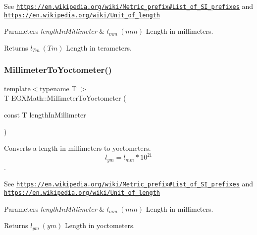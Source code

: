 See \href{https://en.wikipedia.org/wiki/Metric_prefix#List_of_SI_prefixes}{\tt https\+://en.\+wikipedia.\+org/wiki/\+Metric\+\_\+prefix\#\+List\+\_\+of\+\_\+\+S\+I\+\_\+prefixes} and \href{https://en.wikipedia.org/wiki/Unit_of_length}{\tt https\+://en.\+wikipedia.\+org/wiki/\+Unit\+\_\+of\+\_\+length} 
\begin{DoxyParams}{Parameters}
{\em length\+In\+Millimeter} & $ l_{mm}\ (mm)$ Length in millimeters. \\
\hline
\end{DoxyParams}
\begin{DoxyReturn}{Returns}
$ l_{Tm}\ (Tm)$ Length in terameters. 
\end{DoxyReturn}
\mbox{\label{group___e_g_x_math-_conversions-_length_conversions-_s_i-_millimeter-_s_i_ga7f8020bb633d6ed2cd874a8c66d2893d}} 
\subsubsection{\texorpdfstring{Millimeter\+To\+Yoctometer()}{MillimeterToYoctometer()}}
{\footnotesize\ttfamily template$<$typename T $>$ \\
T E\+G\+X\+Math\+::\+Millimeter\+To\+Yoctometer (\begin{DoxyParamCaption}\item[{const T}]{length\+In\+Millimeter }\end{DoxyParamCaption})}



Converts a length in millimeters to yoctometers. \[ l_{ym}=l_{mm} * 10^{21} \]. 

See \href{https://en.wikipedia.org/wiki/Metric_prefix#List_of_SI_prefixes}{\tt https\+://en.\+wikipedia.\+org/wiki/\+Metric\+\_\+prefix\#\+List\+\_\+of\+\_\+\+S\+I\+\_\+prefixes} and \href{https://en.wikipedia.org/wiki/Unit_of_length}{\tt https\+://en.\+wikipedia.\+org/wiki/\+Unit\+\_\+of\+\_\+length} 
\begin{DoxyParams}{Parameters}
{\em length\+In\+Millimeter} & $ l_{mm}\ (mm)$ Length in millimeters. \\
\hline
\end{DoxyParams}
\begin{DoxyReturn}{Returns}
$ l_{ym}\ (ym)$ Length in yoctometers. 
\end{DoxyReturn}
\mbox{\label{group___e_g_x_math-_conversions-_length_conversions-_s_i-_millimeter-_s_i_ga0c63bb9317c6f47942e00d23d0bf9762}} 
